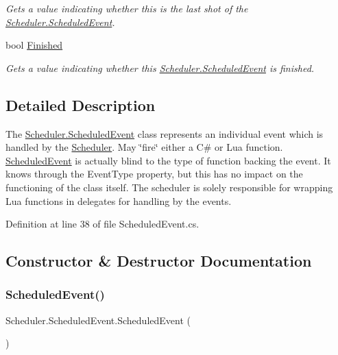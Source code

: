 \begin{DoxyCompactItemize}
\begin{DoxyCompactList}\small\item\em Gets a value indicating whether this is the last shot of the \hyperlink{class_scheduler_1_1_scheduled_event}{Scheduler.\+Scheduled\+Event}. \end{DoxyCompactList}\item 
bool \hyperlink{class_scheduler_1_1_scheduled_event_a18809036499636d4629da4d803c74637}{Finished}
\begin{DoxyCompactList}\small\item\em Gets a value indicating whether this \hyperlink{class_scheduler_1_1_scheduled_event}{Scheduler.\+Scheduled\+Event} is finished. \end{DoxyCompactList}\end{DoxyCompactItemize}


\subsection{Detailed Description}
The \hyperlink{class_scheduler_1_1_scheduled_event}{Scheduler.\+Scheduled\+Event} class represents an individual event which is handled by the \hyperlink{class_scheduler_1_1_scheduler}{Scheduler}. May \char`\"{}fire\char`\"{} either a C\# or Lua function. \hyperlink{class_scheduler_1_1_scheduled_event}{Scheduled\+Event} is actually blind to the type of function backing the event. It knows through the Event\+Type property, but this has no impact on the functioning of the class itself. The scheduler is solely responsible for wrapping Lua functions in delegates for handling by the events. 



Definition at line 38 of file Scheduled\+Event.\+cs.



\subsection{Constructor \& Destructor Documentation}
\mbox{\label{class_scheduler_1_1_scheduled_event_a572dadae169da9d187678a0f1471389c}} 
\subsubsection{\texorpdfstring{Scheduled\+Event()}{ScheduledEvent()}\hspace{0.1cm}{\footnotesize\ttfamily [1/6]}}
{\footnotesize\ttfamily Scheduler.\+Scheduled\+Event.\+Scheduled\+Event (\begin{DoxyParamCaption}{ }\end{DoxyParamCaption})}



